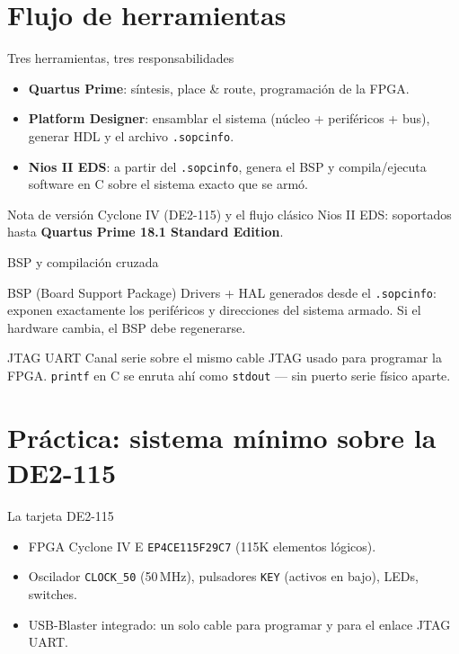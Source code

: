 \documentclass[11pt]{beamer}
\begin{document}
\section{Flujo de herramientas}

\begin{frame}{Tres herramientas, tres responsabilidades}
  \begin{itemize}
    \item \textbf{Quartus Prime}: síntesis, place \& route, programación de la FPGA.
    \item \textbf{Platform Designer}: ensamblar el sistema (núcleo + periféricos + bus),
          generar HDL y el archivo \texttt{.sopcinfo}.
    \item \textbf{Nios II EDS}: a partir del \texttt{.sopcinfo}, genera el BSP y compila/ejecuta
          software en C sobre el sistema exacto que se armó.
  \end{itemize}
  \vfill
  \begin{alertblock}{Nota de versión}
    Cyclone IV (DE2-115) y el flujo clásico Nios II EDS: soportados hasta
    \textbf{Quartus Prime 18.1 Standard Edition}.
  \end{alertblock}
\end{frame}

\begin{frame}{BSP y compilación cruzada}
  \begin{block}{BSP (Board Support Package)}
    Drivers + HAL generados desde el \texttt{.sopcinfo}: exponen exactamente los periféricos y
    direcciones del sistema armado. Si el hardware cambia, el BSP debe regenerarse.
  \end{block}
  \begin{block}{JTAG UART}
    Canal serie sobre el mismo cable JTAG usado para programar la FPGA. \texttt{printf} en C se
    enruta ahí como \texttt{stdout} --- sin puerto serie físico aparte.
  \end{block}
\end{frame}

\section{Práctica: sistema mínimo sobre la DE2-115}

\begin{frame}{La tarjeta DE2-115}
  \begin{itemize}
    \item FPGA Cyclone IV E \texttt{EP4CE115F29C7} (115K elementos lógicos).
    \item Oscilador \texttt{CLOCK\_50} (50\,MHz), pulsadores \texttt{KEY} (activos en bajo),
          LEDs, switches.
    \item USB-Blaster integrado: un solo cable para programar y para el enlace JTAG UART.
  \end{itemize}
\end{frame}
\end{document}
